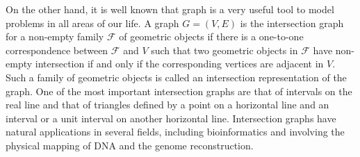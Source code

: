 \documentclass{article}
\theoremstyle{definition}
\begin{document}
On the other hand, it is well known that graph is a very useful tool to model problems in all
areas of our life.
A graph $G=(V,E)$ is the intersection graph for a non-empty family $\mathcal{F}$ of geometric objects
if there is a one-to-one correspondence between $\mathcal{F}$ and $V$ 
such that two
geometric objects in $\mathcal{F}$ have non-empty intersection if and only if the corresponding vertices 
are adjacent in $V$. 
Such a family of geometric objects is called an intersection representation of the graph. 
One of the most important intersection graphs are that of intervals on the real line and that of
triangles defined by a point on a horizontal line and an interval or a unit interval on another horizontal line. 
Intersection graphs have natural applications in several fields, including bioinformatics and involving the 
physical mapping of DNA and the genome reconstruction.
\end{document}

